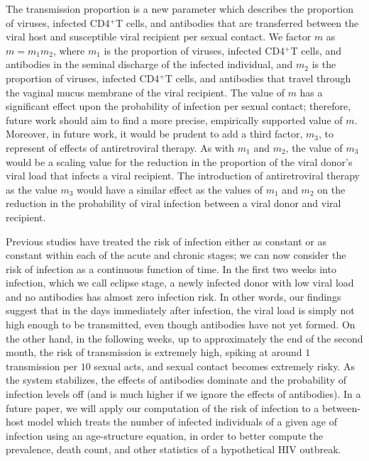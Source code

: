 \documentclass[]{elsarticle}
\theoremstyle{definition}
\begin{document}
The transmission proportion is a new parameter which describes the proportion of viruses, infected CD4$^+$T cells, and antibodies that are transferred between the viral host and susceptible viral recipient per sexual contact. We factor $m$ as $m = m_1m_2$, where $m_1$ is the proportion of viruses, infected CD4$^+$T cells, and antibodies in the seminal discharge of the infected individual, and $m_2$ is the proportion of viruses, infected CD4$^+$T cells, and antibodies that travel through the vaginal mucus membrane of the viral recipient. The value of $m$ has a significant effect upon the probability of infection per sexual contact; therefore, future work should aim to find a more precise, empirically supported value of $m$. Moreover, in future work, it would be prudent to add a third factor, $m_3$, to represent of effects of antiretroviral therapy. As with $m_1$ and $m_2$, the value of $m_3$ would be a scaling value for the reduction in the proportion of the viral donor's viral load that infects a viral recipient. The introduction of antiretroviral therapy as the value $m_3$ would have a similar effect as the values of $m_1$ and $m_2$ on the reduction in the probability of viral infection between a viral donor and viral recipient.

Previous studies have treated the risk of infection either as constant or as constant within each of the acute and chronic stages; we can now consider the risk of infection as a continuous function of time. In the first two weeks into infection, which we call eclipse stage, a newly infected donor with low viral load and no antibodies has almost zero infection risk. In other words, our findings suggest that in the days immediately after infection, the viral load is simply not high enough to be transmitted, even though antibodies have not yet formed. On the other hand, in the following weeks, up to approximately the end of the second month, the risk of transmission is extremely high, spiking at around $1$ transmission per $10$ sexual acts, and sexual contact becomes extremely risky. As the system stabilizes, the effects of antibodies dominate and the probability of infection levels off (and is much higher if we ignore the effects of antibodies). In a future paper, we will apply our computation of the risk of infection to a between-host model which treats the number of infected individuals of a given age of infection using an age-structure equation, in order to better compute the prevalence, death count, and other statistics of a hypothetical HIV outbreak.
\end{document}
